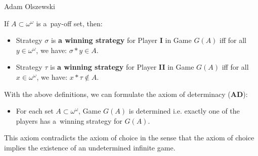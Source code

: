 \begin{artengenv}{Adam Olszewski}
%
%
%
%
%
%
%
%
%
%
%
%
%
%
%

If $A \subset \omega^{\omega}$ is a~pay-off set, then:
\begin{itemize}
\item Strategy $\sigma$ is \textbf{a winning strategy} for Player \textbf{I} in Game $G(A)$ iff for all $y\in\omega^{\omega}$, we have: $\sigma*y \in A$.
\item Strategy $\tau$ is \textbf{a winning strategy} for Player \textbf{II} in Game $G(A)$ iff for all $x\in \omega^{\omega}$, we have: $x*\tau \not\in A$.
\end{itemize}
With the above definitions, we can formulate the axiom of determinacy (\textbf{AD}):
\begin{itemize}
\item For each set $A\subset \omega^{\omega}$, Game $G(A)$ is determined i.e. exactly one of the players has a~winning strategy for $G(A)$.\qedsymbol
\end{itemize}
This axiom contradicts the axiom of choice in the sense that the axiom of choice implies the existence of an undetermined infinite game.


\end{artengenv}
